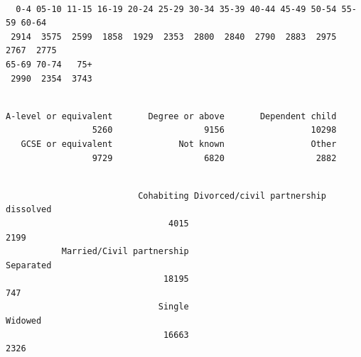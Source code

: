\documentclass[
  letterpaper,
  DIV=11,
  numbers=noendperiod]{scrreprt}
\newenvironment{Shaded}{\begin{snugshade}}{\end{snugshade}}
\newcommand{\CommentTok}[1]{\textcolor[rgb]{0.37,0.37,0.37}{#1}}
\newcommand{\FunctionTok}[1]{\textcolor[rgb]{0.28,0.35,0.67}{#1}}
\newcommand{\NormalTok}[1]{\textcolor[rgb]{0.00,0.23,0.31}{#1}}
\newcommand{\SpecialCharTok}[1]{\textcolor[rgb]{0.37,0.37,0.37}{#1}}
\begin{document}
\begin{Shaded}
\end{Shaded}

\begin{verbatim}

  0-4 05-10 11-15 16-19 20-24 25-29 30-34 35-39 40-44 45-49 50-54 55-59 60-64 
 2914  3575  2599  1858  1929  2353  2800  2840  2790  2883  2975  2767  2775 
65-69 70-74   75+ 
 2990  2354  3743 
\end{verbatim}

\begin{Shaded}
\end{Shaded}

\begin{verbatim}

A-level or equivalent       Degree or above       Dependent child 
                 5260                  9156                 10298 
   GCSE or equivalent             Not known                 Other 
                 9729                  6820                  2882 
\end{verbatim}

\begin{Shaded}
\end{Shaded}

\begin{verbatim}

                          Cohabiting Divorced/civil partnership dissolved 
                                4015                                 2199 
           Married/Civil partnership                            Separated 
                               18195                                  747 
                              Single                              Widowed 
                               16663                                 2326 
\end{verbatim}

\begin{Shaded}
\end{Shaded}
\end{document}
